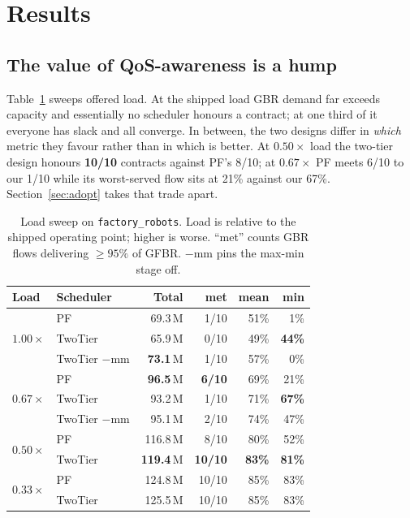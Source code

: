 \documentclass[conference]{IEEEtran}
\begin{document}
\section{Results}\label{sec:results}

\subsection{The value of QoS-awareness is a hump}\label{sec:hump}

Table~\ref{tab:sweep} sweeps offered load. At the shipped load GBR demand
far exceeds capacity and essentially no scheduler honours a contract; at one
third of it everyone has slack and all converge. In between, the two designs
differ in \emph{which} metric they favour rather than in which is better. At
$0.50\times$ load the two-tier design honours \textbf{10/10} contracts
against PF's 8/10; at $0.67\times$ PF meets 6/10 to our 1/10 while its
worst-served flow sits at 21\% against our 67\%. Section~\ref{sec:adopt}
takes that trade apart.

\begin{table}[t]
\caption{Load sweep on \texttt{factory\_robots}. Load is relative to the
shipped operating point; higher is worse. ``met'' counts GBR flows
delivering $\ge 95\%$ of GFBR. $-$mm pins the max-min stage off.}
\label{tab:sweep}
\centering
\small
\begin{tabular}{@{}llrrrr@{}}
\toprule
Load & Scheduler & Total & met & mean & min \\
\midrule
\multirow{3}{*}{$1.00\times$}
 & PF               & 69.3\,M & 1/10 & 51\% & 1\% \\
 & TwoTier          & 65.9\,M & 0/10 & 49\% & \textbf{44\%} \\
 & TwoTier $-$mm    & \textbf{73.1}\,M & 1/10 & 57\% & 0\% \\
\midrule
\multirow{3}{*}{$0.67\times$}
 & PF               & \textbf{96.5}\,M & \textbf{6/10} & 69\% & 21\% \\
 & TwoTier          & 93.2\,M & 1/10 & 71\% & \textbf{67\%} \\
 & TwoTier $-$mm    & 95.1\,M & 2/10 & 74\% & 47\% \\
\midrule
\multirow{2}{*}{$0.50\times$}
 & PF               & 116.8\,M & 8/10 & 80\% & 52\% \\
 & TwoTier          & \textbf{119.4}\,M & \textbf{10/10} & \textbf{83\%} & \textbf{81\%} \\
\midrule
\multirow{2}{*}{$0.33\times$}
 & PF               & 124.8\,M & 10/10 & 85\% & 83\% \\
 & TwoTier          & 125.5\,M & 10/10 & 85\% & 83\% \\
\bottomrule
\end{tabular}
\end{table}
\end{document}
